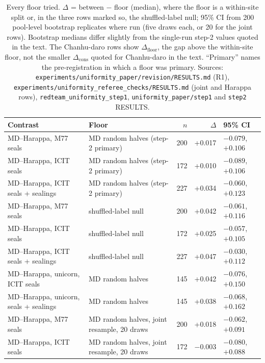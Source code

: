 \documentclass[11pt,a4paper]{article}
\begin{document}
\begin{table}[t]
\centering
\small
\caption{Every floor tried. $\Delta$ = between $-$ floor (median), where the floor is a within-site split or, in the three rows marked so, the shuffled-label null; 95\% CI from 200 pool-level bootstrap replicates where run (five draws each, or 20 for the joint rows). Bootstrap medians differ slightly from the single-run step-2 values quoted in the text. The Chanhu-daro rows show $\Delta_{\mathrm{floor}}$, the gap above the within-site floor, not the smaller $\Delta_{\mathrm{cons}}$ quoted for Chanhu-daro in the text. ``Primary'' names the pre-registration in which a floor was primary. Sources: \nolinkurl{experiments/uniformity_paper/revision/RESULTS.md} (R1), \nolinkurl{experiments/uniformity_referee_checks/RESULTS.md} (joint and Harappa rows), \texttt{redteam\_uniformity\_step1}, \nolinkurl{uniformity_paper/step1} and \texttt{step2} RESULTS.}
\label{tab:floors}
\begin{tabularx}{\textwidth}{lXrrl}
\toprule
Contrast & Floor & $n$ & $\Delta$ & 95\% CI \\
\midrule
MD--Harappa, M77 seals & MD random halves (step-2 primary) & 200 & +0.017 & $-0.079$, $+0.106$ \\ %
MD--Harappa, ICIT seals & MD random halves (step-2 primary) & 172 & +0.010 & $-0.089$, $+0.106$ \\ %
MD--Harappa, ICIT seals + sealings & MD random halves (step-2 primary) & 227 & +0.034 & $-0.060$, $+0.123$ \\ %
MD--Harappa, M77 seals & shuffled-label null & 200 & +0.042 & $-0.061$, $+0.116$ \\ %
MD--Harappa, ICIT seals & shuffled-label null & 172 & +0.025 & $-0.057$, $+0.105$ \\ %
MD--Harappa, ICIT seals + sealings & shuffled-label null & 227 & +0.047 & $-0.030$, $+0.112$ \\ %
MD--Harappa, unicorn, ICIT seals & MD random halves & 145 & +0.042 & $-0.076$, $+0.150$ \\ %
MD--Harappa, unicorn, seals + sealings & MD random halves & 145 & +0.038 & $-0.068$, $+0.162$ \\ %
MD--Harappa, M77 seals & MD random halves, joint resample, 20 draws & 200 & +0.018 & $-0.062$, $+0.091$ \\ %
MD--Harappa, ICIT seals & MD random halves, joint resample, 20 draws & 172 & $-0.003$ & $-0.080$, $+0.088$ \\ %

\end{tabularx}
\end{table}
\end{document}
